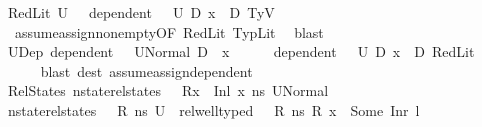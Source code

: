 \begin{isabellebody}
\ RedLit\ {\isacartoucheopen}U{}\ {\isasymnoteq}\ {\isacharbraceleft}{\kern0pt}{\isacharbraceright}{\kern0pt}{\isacartoucheclose}\ {\isacartoucheopen}dependent\ {\isasymLambda}{\isacharprime}{\kern0pt}\ {\isasymOmega}\ U{}\ D{}{\isacartoucheclose}\ {\isacartoucheopen}x{}\ {\isasymnotin}\ D{}{\isacartoucheclose}\ TyV\isanewline
\ \ \ \ \isamarkupfalse%
\ \ assume{\isacharunderscore}{\kern0pt}assign{\isacharunderscore}{\kern0pt}non{\isacharunderscore}{\kern0pt}empty{\isacharbrackleft}{\kern0pt}OF\ RedLit\ TypLit{\isacharbrackright}{\kern0pt}\ \isamarkupfalse%
\ blast\isanewline
\ \ \isamarkupfalse%
\ U{}Dep{\isacharcolon}{\kern0pt}\ {\isachardoublequoteopen}dependent\ {\isasymLambda}{\isacharprime}{\kern0pt}\ {\isasymOmega}\ {\isacharquery}{\kern0pt}U{}Normal\ {\isacharparenleft}{\kern0pt}D{}\ {\isasymunion}\ {\isacharbraceleft}{\kern0pt}x{}{\isacharbraceright}{\kern0pt}{\isacharparenright}{\kern0pt}{\isachardoublequoteclose}\isanewline
\ \ \ \ \isamarkupfalse%
\ {\isacartoucheopen}dependent\ {\isasymLambda}{\isacharprime}{\kern0pt}\ {\isasymOmega}\ U{}\ D{}{\isacartoucheclose}\ {\isacartoucheopen}x{}\ {\isasymnotin}\ D{}{\isacartoucheclose}\ RedLit\isanewline
\ \ \ \ \isamarkupfalse%
\ {\isacharparenleft}{\kern0pt}blast\ dest{\isacharcolon}{\kern0pt}\ assume{\isacharunderscore}{\kern0pt}assign{\isacharunderscore}{\kern0pt}dependent{\isacharparenright}{\kern0pt}\isanewline
\ \ \isamarkupfalse%
\ RelStates{\isacharcolon}{\kern0pt}\ {\isachardoublequoteopen}nstate{\isacharunderscore}{\kern0pt}rel{\isacharunderscore}{\kern0pt}states\ {\isasymLambda}\ {\isasymLambda}{\isacharprime}{\kern0pt}\ {\isacharparenleft}{\kern0pt}R{\isacharparenleft}{\kern0pt}x\ {\isasymmapsto}\ Inl\ x{}{\isacharparenright}{\kern0pt}{\isacharparenright}{\kern0pt}\ ns\ {\isacharquery}{\kern0pt}U{}Normal{\isachardoublequoteclose}\ \isanewline
\ \ \ \ \isamarkupfalse%
\ {\isacartoucheopen}nstate{\isacharunderscore}{\kern0pt}rel{\isacharunderscore}{\kern0pt}states\ {\isasymLambda}\ {\isasymLambda}{\isacharprime}{\kern0pt}\ R\ ns\ U{}{\isacartoucheclose}\ \ {\isacartoucheopen}rel{\isacharunderscore}{\kern0pt}well{\isacharunderscore}{\kern0pt}typed\ {\isasymLambda}\ {\isasymOmega}\ R\ ns{\isacartoucheclose}\ {\isacartoucheopen}R\ x\ {\isacharequal}{\kern0pt}\ Some\ {\isacharparenleft}{\kern0pt}Inr\ l{\isacharparenright}{\kern0pt}{\isacartoucheclose}\isanewline

\end{isabellebody}
